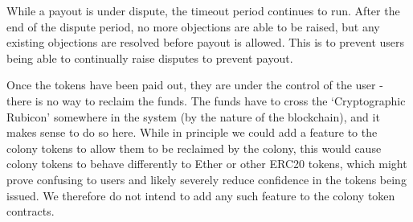 While a payout is under dispute, the timeout period continues to run. After the end of the dispute period, no more objections are able to be raised, but any existing objections are resolved before payout is allowed.  This is to prevent users being able to continually raise disputes to prevent payout.

Once the tokens have been paid out, they are under the control of the user - there is no way to reclaim the funds. The funds have to cross the `Cryptographic Rubicon' somewhere in the system (by the nature of the blockchain), and it makes sense to do so here. While in principle we could add a feature to the colony tokens to allow them to be reclaimed by the colony, this would cause colony tokens to behave differently to Ether or other ERC20 tokens, which might prove confusing to users and likely severely reduce confidence in the tokens being issued. We therefore do not intend to add any such feature to the colony token contracts.